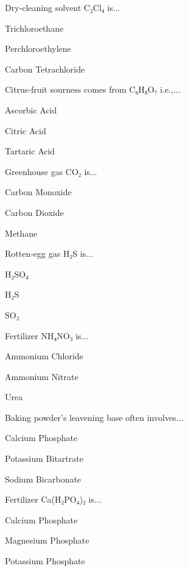 \begin{enhancedmcq}{Dry‑cleaning solvent C₂Cl₄ is...}
\item Trichloroethane
\item Perchloroethylene
\item Carbon Tetrachloride

\end{enhancedmcq}
\begin{enhancedmcq}{Citrus‑fruit sourness comes from C₆H₈O₇ i.e.,...}
\item Ascorbic Acid
\item Citric Acid
\item Tartaric Acid

\end{enhancedmcq}
\begin{enhancedmcq}{Greenhouse gas CO₂ is...}
\item Carbon Monoxide
\item Carbon Dioxide
\item Methane

\end{enhancedmcq}
\begin{enhancedmcq}{Rotten‑egg gas H₂S is...}
\item H₂SO₄
\item H₂S
\item SO₂

\end{enhancedmcq}
\begin{enhancedmcq}{Fertilizer NH₄NO₃ is...}
\item Ammonium Chloride
\item Ammonium Nitrate
\item Urea

\end{enhancedmcq}
\begin{enhancedmcq}{Baking powder's leavening base often involves...}
\item Calcium Phosphate
\item Potassium Bitartrate
\item Sodium Bicarbonate

\end{enhancedmcq}
\begin{enhancedmcq}{Fertilizer Ca(H₂PO₄)₂ is...}
\item Calcium Phosphate
\item Magnesium Phosphate
\item Potassium Phosphate

\end{enhancedmcq}
